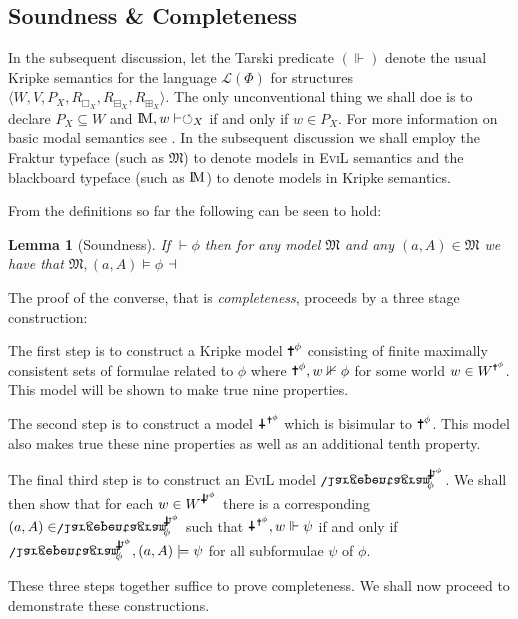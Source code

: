 \documentclass[11pt]{article}
\numberwithin{equation}{subsection}
\newtheorem{lemma}[theorem]{Lemma}
\newcommand{\ra}{\rangle}
\renewcommand{\Cross}{\textrm{\ding{61}}}
\newcommand{\iCross}{\mathrel{\reflectbox{\rotatebox[origin=c]{180}{\textrm{\ding{61}}}}}\!}
\newcommand{\ipent}{\mathrel{\reflectbox{\rotatebox[origin=c]{180}{\ensuremath{\largepentagram}}}}\!\!\!}
\newcommand{\BB}{\boxminus}
\newcommand{\BBI}{\boxplus}
\newcommand{\PP}{\circlearrowleft}
\begin{document}
\subsection{Soundness \& Completeness}

In the subsequent discussion, let the Tarski predicate $(\Vdash)$ denote the usual Kripke semantics for the language $\mathcal{L}(\Phi)$ for structures $\langle W, V, P_X, R_{\Box_X}, R_{\BB_X}, R_{\BBI_X}\ra$.  The only unconventional thing we shall doe is to declare $P_X \subseteq W$ and $\bbM,w \vdash \PP_X$ if and only if $w \in P_X$.  For more information on basic modal semantics see \citet{blackburn2001modal}.  In the subsequent discussion we shall employ the Fraktur typeface (such as $\mathfrak{M}$) to denote models in \textsc{EviL} semantics and the blackboard typeface (such as $\bbM$) to denote models in Kripke semantics.


From the definitions so far the following can be seen to hold:
\begin{lemma}[Soundness]
If $\vdash \phi$ then for any model $\mathfrak{M}$ and any $(a,A) \in \mathfrak{M}$ we have that $\mathfrak{M},(a,A) \models \phi$ 
$\hfill\dashv$\end{lemma}

The proof of the converse, that is \emph{completeness}, proceeds by a three stage construction:
\begin{bul}
\item The first step is to construct a Kripke model $\Cross^\phi$ consisting of finite maximally consistent sets of formulae related to $\phi$ where $\Cross^\phi,w \nVdash \phi$ for some world $w \in W^{\Cross^\phi}$. This model will be shown to make true nine properties.
\item The second step is to construct a model ${\iCross^{\Cross^\phi}}$ which is bisimular to $\Cross^\phi$. This model also makes true these nine properties as well as an additional tenth property.
\item The final third step is to construct an \textsc{EviL} model ${\ipent^{\iCross^{\Cross^\phi}}_\phi}$.
We shall then show that for each $w \in W^{\iCross^{\Cross^\phi}}$ there is a corresponding $(a,A) \in \ipent^{\iCross^{\Cross^\phi}}_\phi$ such that ${\iCross^{\Cross^\phi}}, w \Vdash \psi$ if and only if ${\ipent^{\iCross^{\Cross^\phi}}_\phi},(a,A) \models \psi$ for all subformulae $\psi$ of $\phi$.
\end{bul}
These three steps together suffice to prove completeness.  We shall now proceed to demonstrate these constructions.
\end{document}
